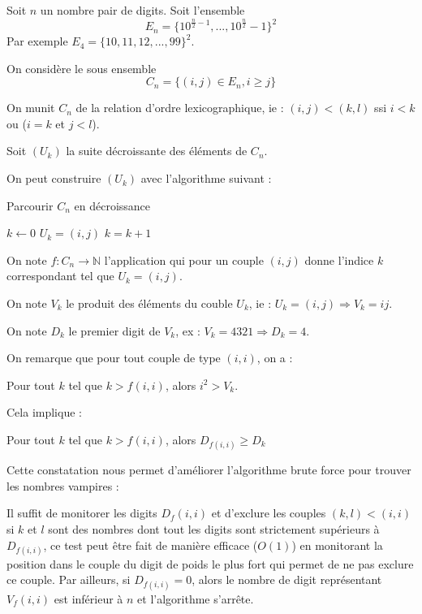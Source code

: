 \documentclass[10pt,a4paper,final]{article}
\begin{document}
Soit $n$ un nombre pair de digits.
Soit l'ensemble $$E_n=\{10^{\frac{n}{2}-1},...,10^{\frac{n}{2}}-1\}^2$$
Par exemple $E_4 = \{10,11,12,...,99\}^2$.

On considère le sous ensemble $$C_n = \{(i,j) \in E_n, i\geq j\}$$ 

On munit $C_n$ de la relation d'ordre lexicographique, ie :
$(i,j) < (k,l)$ ssi $i<k$ ou ($i=k$ et $j<l$).

Soit $(U_k)$ la suite décroissante des éléments de $C_n$.

On peut construire $(U_k)$ avec l'algorithme suivant : 
\begin{algorithm}
\caption{Parcourir $C_n$ en décroissance}
\begin{algorithmic} 
\STATE $k \leftarrow 0$
\STATE $U_k = (i,j)$
\STATE $k=k+1$
\ENDFOR
\ENDFOR
\end{algorithmic}
\end{algorithm}

On note $f : C_n \longrightarrow \mathbb{N}$ l'application qui pour un couple $(i,j)$ donne l'indice $k$ correspondant tel que $U_k = (i,j)$.

On note $V_k$ le produit des éléments du couble $U_k$, ie :
$U_k = (i,j) \Rightarrow V_k = ij$.

On note $D_k$ le premier digit de $V_k$, ex :
$V_k=4321 \Rightarrow D_k=4$.

On remarque que pour tout couple de type $(i,i)$, on a :

Pour tout $k$ tel que $k > f(i,i)$, alors $i^2>V_k$.

Cela implique :

Pour tout $k$ tel que $k > f(i,i)$, alors $D_{f(i,i)}\geq D_k$


Cette constatation nous permet d'améliorer l'algorithme brute force pour trouver les nombres vampires :

Il suffit de monitorer les digits $D_f(i,i)$ et d'exclure les couples $(k,l)<(i,i)$ si $k$ et $l$ sont des nombres dont tout les digits sont strictement supérieurs à $D_{f(i,i)}$, ce test peut être fait de manière efficace ($O(1)$) en monitorant la position dans le couple du digit de poids le plus fort qui permet de ne pas exclure ce couple.
Par ailleurs, si $D_{f(i,i)} = 0$, alors le nombre de digit représentant $V_f(i,i)$ est inférieur à $n$ et l'algorithme s'arrête.
\newline
\end{document}
